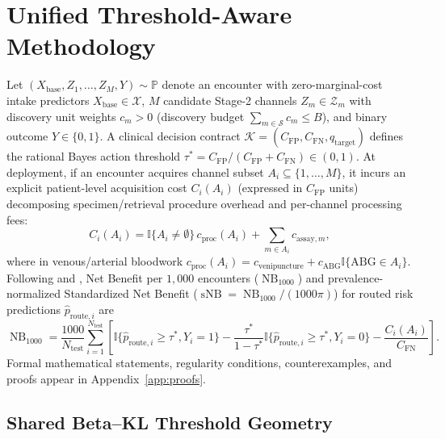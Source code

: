 \documentclass[11pt]{article}
\begin{document}
\section{Unified Threshold-Aware Methodology}
\label{sec:methods}

Let $(X_{\text{base}}, Z_1, \dots, Z_M, Y) \sim \mathbb{P}$ denote an encounter with zero-marginal-cost intake predictors $X_{\text{base}} \in \mathcal{X}$, $M$ candidate Stage-2 channels $Z_m \in \mathcal{Z}_m$ with discovery unit weights $c_m > 0$ (discovery budget $\sum_{m \in \mathcal{S}} c_m \le B$), and binary outcome $Y \in \{0,1\}$. A clinical decision contract $\mathcal{K} = (C_{\text{FP}}, C_{\text{FN}}, q_{\text{target}})$ defines the rational Bayes action threshold $\tau^* = C_{\text{FP}} / (C_{\text{FP}} + C_{\text{FN}}) \in (0, 1)$. At deployment, if an encounter acquires channel subset $A_i \subseteq \{1,\dots,M\}$, it incurs an explicit patient-level acquisition cost $C_i(A_i)$ (expressed in $C_{\text{FP}}$ units) decomposing specimen/retrieval procedure overhead and per-channel processing fees:
\begin{equation}
  C_i(A_i) = \mathbb{I}\{A_i \ne \emptyset\}\, c_{\text{proc}}(A_i) + \sum_{m \in A_i} c_{\text{assay}, m},
  \label{eq:cost_ledger}
\end{equation}
where in venous/arterial bloodwork $c_{\text{proc}}(A_i) = c_{\text{venipuncture}} + c_{\text{ABG}}\mathbb{I}\{\text{ABG} \in A_i\}$. Following \citet{vickers2006decision} and \citet{kerr2016assessing}, Net Benefit per $1{,}000$ encounters ($\operatorname{NB}_{1000}$) and prevalence-normalized Standardized Net Benefit ($\operatorname{sNB} = \operatorname{NB}_{1000}/(1000\pi)$) for routed risk predictions $\hat{p}_{\text{route},i}$ are
\begin{equation}
  \operatorname{NB}_{1000} = \frac{1000}{N_{\text{test}}} \sum_{i=1}^{N_{\text{test}}} \left[ \mathbb{I}\{\hat{p}_{\text{route},i} \ge \tau^*, Y_i = 1\} - \frac{\tau^*}{1-\tau^*} \mathbb{I}\{\hat{p}_{\text{route},i} \ge \tau^*, Y_i = 0\} - \frac{C_i(A_i)}{C_{\text{FN}}} \right].
  \label{eq:nb_ledger}
\end{equation}
Formal mathematical statements, regularity conditions, counterexamples, and proofs appear in Appendix~\ref{app:proofs}.

\subsection{Shared Beta--KL Threshold Geometry}
\label{sec:geometry}
\end{document}
